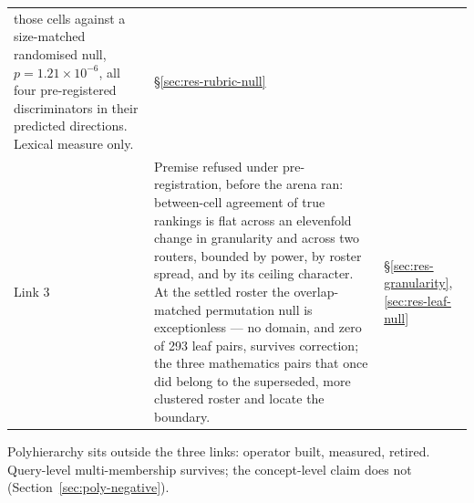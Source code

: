 \begin{table}[htbp]
\begin{tabular}{p{1.4cm}p{7.8cm}p{3.2cm}}
those cells against a size-matched randomised null,
$p = 1.21 \times 10^{-6}$, all four pre-registered discriminators in
their predicted directions. Lexical measure only. &
\S\ref{sec:res-rubric-null} \\
\addlinespace
Link 3 & Premise refused under pre-registration, before the arena ran:
between-cell agreement of true rankings is flat across an elevenfold
change in granularity and across two routers, bounded by power, by
roster spread, and by its ceiling character. At the settled roster the
overlap-matched permutation null is exceptionless --- no domain, and
zero of 293 leaf pairs, survives correction; the three mathematics
pairs that once did belong to the superseded, more clustered roster
and locate the boundary. &
\S\ref{sec:res-granularity}, \ref{sec:res-leaf-null} \\
\bottomrule
\end{tabular}
\end{table}

Polyhierarchy sits outside the three links: operator built, measured,
retired. Query-level multi-membership survives; the concept-level
claim does not (Section~\ref{sec:poly-negative}).
